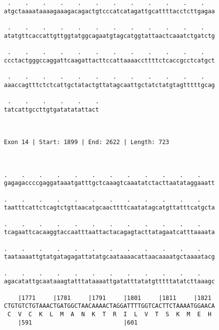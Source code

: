 \documentclass{article}
\begin{document}
\begin{Verbatim}
 .    .    .    .    .    .    .    .    .    .    .    .   
atgctaaaataaaagaaagacagactgtcccatcatagattgcattttacctcttgagaa
                                                            
 .    .    .    .    .    .    .    .    .    .    .    .   
atatgttcaccattgttggtatggcagaatgtagcatggtattaactcaaatctgatctg
                                                            
 .    .    .    .    .    .    .    .    .    .    .    .   
ccctactgggccaggattcaagattacttccattaaaaccttttctcaccgcctcatgct
                                                            
 .    .    .    .    .    .    .    .    .    .    .    .   
aaaccagtttctctcattgctatactgttatagcaattgctatctatgtagtttttgcag
                                                            
 .    .    .    .    .    .
tatcattgccttgtgatatatattact
                           
                           
 
Exon 14 | Start: 1899 | End: 2622 | Length: 723



.    .    .    .    .    .    .    .    .    .    .    .    
gagagaccccgaggataaatgatttgctcaaagtcaaatatctacttaatataggaaatt
                                                            
.    .    .    .    .    .    .    .    .    .    .    .    
taatttcattctcagtctgttaacatgcaacttttcaatatagcatgttatttcatgcta
                                                            
.    .    .    .    .    .    .    .    .    .    .    .    
tcagaattcacaaggtaccaatttaattactacagagtacttatagaatcatttaaaata
                                                            
.    .    .    .    .    .    .    .    .    .    .    .    
taataaaattgtatgatagagattatatgcaataaaacattaacaaaatgctaaaatacg
                                                            
.    .    .    .    .    .    .    .    .    .    .    .    
agacatattgcaataaagtatttataaaattgatatttatatgtttttatatcttaaagc
                                                            
    |1771     |1781     |1791     |1801     |1811     |1821 
CTGTGTCTGTAAACTGATGGCTAACAAAACTAGGATTTTGGTCACTTCTAAAATGGAACA
 C  V  C  K  L  M  A  N  K  T  R  I  L  V  T  S  K  M  E  H 
    |591                          |601                      
  

\end{Verbatim}
\end{document}
